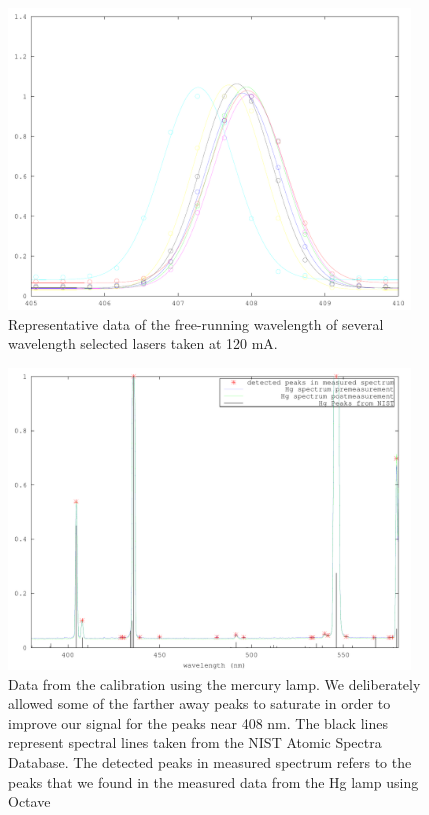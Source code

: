 \begin{figure}
\centering
\includegraphics[width=0.95\textwidth]{wavelength_selected} 
\caption[Wavelength selected diodes]{\label{3dCurrentandTgraph} Representative data of the free-running wavelength of several wavelength selected lasers taken at 120 mA.} %
\end{figure}
\begin{figure}
\centering
\includegraphics[width=0.95\textwidth]{calibrationData} 
\caption[Graph of Temperatures and Currents]{\label{calibrationData} Data from the calibration using the mercury lamp. We deliberately allowed some of the farther away peaks to saturate in order to improve our signal for the peaks near 408 nm. The black lines represent spectral lines taken from the NIST Atomic Spectra Database\cite{NISTasd}. The detected peaks in measured spectrum refers to the peaks that we found in the measured data from the Hg lamp using Octave}
\end{figure}

